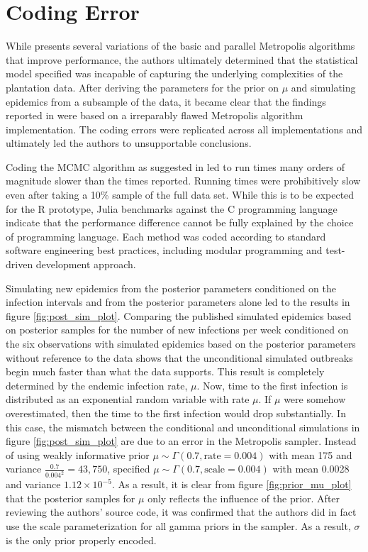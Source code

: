 \documentclass{uwstat572}
\begin{document}
\newpage

\section{Coding Error}
\label{coding_error}


While \citet{Brown} presents several variations of the basic and parallel Metropolis algorithms that improve performance, the authors ultimately determined that the statistical model specified was incapable of capturing the underlying complexities of the plantation data. 
After deriving the parameters for the prior on $\mu$ and simulating epidemics from a subsample of the data, it became clear that the findings reported in \citet{Brown} were based on a irreparably flawed Metropolis algorithm implementation. 
The coding errors were replicated across all implementations and ultimately led the authors to unsupportable conclusions.

Coding the MCMC algorithm as suggested in \citet{Brown} led to run times many orders of magnitude slower than the times reported. 
Running times were prohibitively slow even after taking a 10\% sample of the full data set. 
While this is to be expected for the R prototype, Julia benchmarks against the C programming language indicate that the performance difference cannot be fully explained by the choice of programming language. 
Each method was coded according to standard software engineering best practices, including modular programming and test-driven development approach.  

Simulating new epidemics from the posterior parameters conditioned on the infection intervals and from the posterior parameters alone led \citet{Brown} to the results in figure \ref{fig:post_sim_plot}. 
Comparing the published simulated epidemics based on posterior samples for the number of new infections per week conditioned on the six observations with simulated epidemics based on the posterior parameters without reference to the data shows that the unconditional simulated outbreaks begin much faster than what the data supports. 
This result is completely determined by the endemic infection rate, $\mu$. 
Now, time to the first infection is distributed as an exponential random variable with rate $\mu$. 
If $\mu$ were somehow overestimated, then the time to the first infection would drop substantially.
In this case, the mismatch between the conditional and unconditional simulations in figure \ref{fig:post_sim_plot} are due to an error in the Metropolis sampler. 
Instead of using weakly informative prior $\mu \sim \Gamma(0.7, \text{rate}=0.004)$ with mean 175 and variance $\frac{0.7}{0.004^2}=43,750$, \citep{Brown} specified $\mu \sim \Gamma(0.7, \text{scale}=0.004)$ with mean 0.0028 and variance $1.12\times10^{-5}$. 
As a result, it is clear from figure \ref{fig:prior_mu_plot} that the posterior samples for $\mu$ only reflects the influence of the prior. 
After reviewing the authors' source code, it was confirmed that the authors did in fact use the scale parameterization for all gamma priors in the sampler. 
As a result, $\sigma$ is the only prior properly encoded. 
\end{document}
